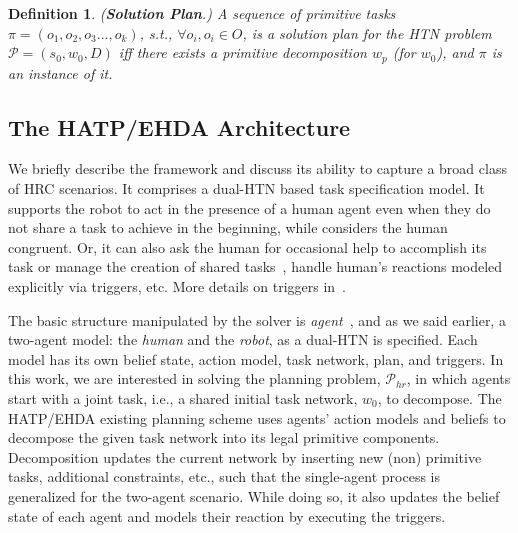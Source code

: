 \documentclass[letterpaper]{article} %
\newtheorem{definition}{Definition}
\begin{document}
\begin{definition} \label{def:htn-sol-plan}
(\textbf{Solution Plan}.) 
{A sequence of primitive tasks $\pi=(o_1,o_2,o_3...,o_k)$, s.t., $\forall o_i, o_i \in O$, is a solution plan for the HTN problem $\mathcal{P}=(s_0,w_0,D)$ iff there exists a primitive decomposition $w_p$ (for $w_0$), and $\pi$ is an instance of it. 
}  
\end{definition}

\subsection{The HATP/EHDA Architecture}
We briefly describe the framework and discuss its ability to capture a broad class of HRC scenarios. 
It comprises a dual-HTN based task specification model. It supports the robot to act in the presence of a human agent even when they do not share a task to achieve in the beginning, while considers the human congruent. 
Or, it can also ask the human for occasional help to accomplish its task or manage the creation of shared tasks~\cite{buisan:hal-03684211}, handle human's reactions modeled explicitly via triggers, etc. More details on triggers  in~\cite{ingrand1996prs,AlamiCFGI98}.  

The basic structure manipulated by the solver is \textit{agent}~\cite{thesisBuisan21}, and as we said earlier, a two-agent model: the \textit{human} and the \textit{robot}, as a dual-HTN is specified. 
Each model has its own belief state, action model, task network, plan, and triggers. In this work, we are interested in solving the planning problem, $\mathcal{P}_{hr}$, in which agents start with a joint task, i.e., a shared initial task network, $w_0$, to decompose.
The HATP/EHDA existing planning scheme uses agents' action models and beliefs to decompose the given task network into its legal primitive components. 
Decomposition updates the current network by inserting new (non) primitive tasks, additional constraints, etc., such that the single-agent process is generalized for the two-agent scenario.
While doing so, it also updates the belief state of each agent and models their reaction by executing the triggers.
\end{document}
